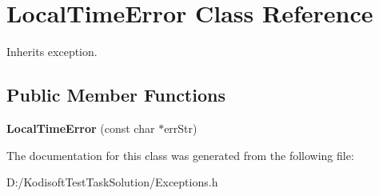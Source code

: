 \hypertarget{class_local_time_error}{\section{Local\+Time\+Error Class Reference}
\label{class_local_time_error}
}


Inherits exception.

\subsection*{Public Member Functions}
\begin{DoxyCompactItemize}
\item 
\hypertarget{class_local_time_error_a2be88e4e5eefc951587742c0a1864008}{{\bfseries Local\+Time\+Error} (const char $\ast$err\+Str)}\label{class_local_time_error_a2be88e4e5eefc951587742c0a1864008}

\end{DoxyCompactItemize}


The documentation for this class was generated from the following file\+:\begin{DoxyCompactItemize}
\item 
D\+:/\+Kodisoft\+Test\+Task\+Solution/Exceptions.\+h\end{DoxyCompactItemize}

